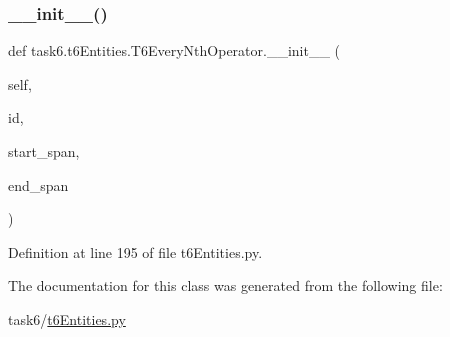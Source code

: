 \subsubsection{\texorpdfstring{\+\_\+\+\_\+init\+\_\+\+\_\+()}{\_\_init\_\_()}}
{\footnotesize\ttfamily def task6.\+t6\+Entities.\+T6\+Every\+Nth\+Operator.\+\_\+\+\_\+init\+\_\+\+\_\+ (\begin{DoxyParamCaption}\item[{}]{self,  }\item[{}]{id,  }\item[{}]{start\+\_\+span,  }\item[{}]{end\+\_\+span }\end{DoxyParamCaption})}



Definition at line 195 of file t6\+Entities.\+py.



The documentation for this class was generated from the following file\+:\begin{DoxyCompactItemize}
\item 
task6/\hyperlink{t6Entities_8py}{t6\+Entities.\+py}\end{DoxyCompactItemize}
